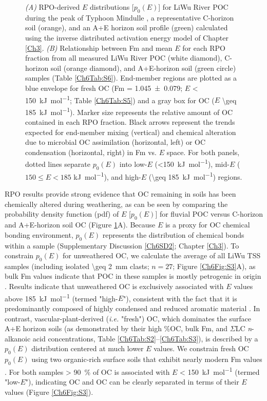 \begin{figure}[p]
	\caption[RPO $p_{0}(E)$ distributions and $E$ vs. Fm plots]{\textit{(A)} RPO-derived $E$ distributions [$p_{0}(E)$] for LiWu River POC during the peak of Typhoon Mindulle \citep[white;][]{Hilton:2008fo}, a representative C-horizon soil (orange), and an A+E horizon soil profile (green) calculated using the inverse distributed activation energy model of Chapter \ref{Ch3}. \textit{(B)} Relationship between Fm and mean $E$ for each RPO fraction from all measured LiWu River POC (white diamond), C-horizon soil (orange diamond), and A+E-horizon soil (green circle) samples (Table \ref{Ch6Tab:S6}). End-member regions are plotted as a blue envelope for fresh OC (Fm = \num{1.045 \pm 0.079}; $E$ \SI{< 150}{kJ.mol^{-1}}; Table \ref{Ch6Tab:S5}) and a gray box for OC ($E$ \SI{\geq 185}{kJ.mol^{-1}}). Marker size represents the relative amount of OC contained in each RPO fraction. Black arrows represent the trends expected for end-member mixing (vertical) and chemical alteration due to microbial OC assimilation (horizontal, left) or OC condensation (horizontal, right) in Fm vs. $E$ space. For both panels, dotted lines separate $p_{0}(E)$ into low-$E$ (\SI{<150}{kJ.mol^{-1}}), mid-$E$ ($150 \leq E < 185$ \si{kJ.mol^{-1}}), and high-$E$ (\SI{\geq 185}{kJ.mol^{-1}}) regions.}
	\label{Ch6Fig:2} 
\end{figure}

RPO results provide strong evidence that OC remaining in soils has been chemically altered during weathering, as can be seen by comparing the probability density function (pdf) of $E$ [$p_{0}(E)$] for fluvial POC versus C-horizon and A+E-horizon soil OC (Figure \ref{Ch6Fig:2}A). Because $E$ is a proxy for OC chemical bonding environment, $p_{0}(E)$ represents the distribution of chemical bonds within a sample (Supplementary Discussion \ref{Ch6SD2}; Chapter \ref{Ch3}). To constrain $p_{0}(E)$ for unweathered OC, we calculate the average of all LiWu TSS samples (including isolated \SI{\geq 2}{mm} clasts; $n = 27$; Figure \ref{Ch6Fig:S3}A), as bulk Fm values indicate that POC in these samples is mostly petrogenic in origin \citep[Table \ref{Ch6Tab:S1};][]{Hilton:2008fo,Hilton:2010cg,Hilton:2011jw}. Results indicate that unweathered OC is exclusively associated with $E$ values above \SI{185}{kJ.mol^{-1}} (termed "high-$E$"), consistent with the fact that it is predominantly composed of highly condensed and reduced aromatic material \citep{Galy:2008ff}. In contrast, vascular-plant-derived (\textit{i.e.} "fresh") OC, which dominates the surface A+E horizon soils (as demonstrated by their high \%OC, bulk Fm, and $\Sigma$LC \textit{n}-alkanoic acid concentrations, Table \ref{Ch6Tab:S2}--\ref{Ch6Tab:S3}), is described by a $p_{0}(E)$ distribution centered at much lower $E$ values. We constrain fresh OC $p_{0}(E)$ using two organic-rich surface soils that exhibit nearly modern Fm values \citep[\%OC \SI{> 5}{\%}, Fm $> 0.96$; Table \ref{Ch6Tab:S2};][]{Hilton:2013kq}. For both samples \SI{> 90}{\%} of OC is associated with $E$ \SI{< 150}{kJ.mol^{-1}} (termed "low-$E$"), indicating OC and OC can be clearly separated in terms of their $E$ values (Figure \ref{Ch6Fig:S3}). 

